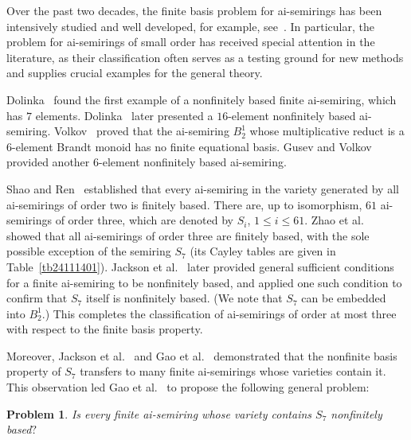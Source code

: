 \documentclass[reqno]{amsart}
\theoremstyle{plain}
\newtheorem{problem}[thm]{Problem}
\theoremstyle{definition}
\begin{document}
Over the past two decades, the finite basis problem for ai-semirings has been intensively studied and well developed,
for example, see~\cite{do, dolinka, dgv24, dgv25, gmrz, gpz, gv2501, jrz, pas05, rjzl, rlzc, rlyc, rz16, rzs20, rzw, sr, shap23, Volkov, wrz, yrzs, zrc, zw}.
In particular, the problem for ai-semirings of small order has received special attention in the literature,
as their classification often serves as a testing ground for new methods and supplies crucial examples for the general theory.

Dolinka~\cite{do} found the first example of a nonfinitely based finite ai-semiring, which has $7$ elements.
Dolinka~\cite{dolinka} later presented a $16$-element nonfinitely based ai-semiring.
Volkov~\cite{Volkov} proved that the ai-semiring $B_2^1$ whose multiplicative reduct is a
$6$-element Brandt monoid has no finite equational basis.
Gusev and Volkov~\cite{gv2501} provided another $6$-element nonfinitely based ai-semiring.

Shao and Ren~\cite{sr} established that every ai-semiring in the
variety generated by all ai-semirings of order two is finitely based.
There are, up to isomorphism, $61$ ai-semirings of order three, which are denoted by $S_i$, $1\leq i \leq 61$.
Zhao et al.~\cite{zrc} showed that all ai-semirings of order three are finitely based,
with the sole possible exception of the semiring $S_7$ (its Cayley tables are given in Table~\ref{tb24111401}).
Jackson et al.~\cite{jrz} later provided general sufficient conditions
for a finite ai-semiring to be nonfinitely based,
and applied one such condition to confirm that $S_7$ itself is nonfinitely based.
(We note that $S_7$ can be embedded into $B_2^1$.)
This completes the classification of ai-semirings of order at most three
with respect to the finite basis property.

Moreover, Jackson et al.~\cite{jrz} and Gao et al.~\cite{gmrz, gjrz2}
demonstrated that the nonfinite basis property of $S_7$ transfers to
many finite ai-semirings whose varieties contain it.
This observation led Gao et al.~\cite{gjrz2} to propose the following general problem:
\begin{problem}\label{prob0127}
Is every finite ai-semiring whose variety contains $S_7$ nonfinitely based$?$
\end{problem}
\end{document}
